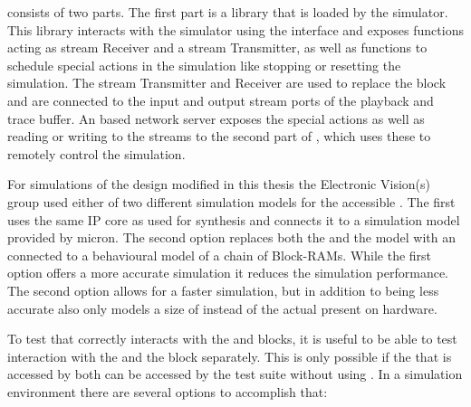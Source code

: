 \flange{} consists of two parts. The first part is a library that is loaded by the simulator. This library interacts with the simulator using the \DPI{} interface and exposes functions acting as stream Receiver and a stream Transmitter, as well as functions to schedule special actions in the simulation like stopping or resetting the simulation. The stream Transmitter and Receiver are used to replace the \HostARQ{} block and are connected to the input and output stream ports of the playback and trace buffer. An \RCF{}\autocite{ref:rcf} based network server exposes the special actions as well as reading or writing to the streams to the second part of \flange{}, which uses these to remotely control the simulation.

For simulations of the \FPGA{} design modified in this thesis the Electronic Vision(s) group used either of two different simulation models for the \AXI{} accessible \DRAM{}. The first uses the same \Xilinx \MIG{} IP core as used for synthesis and connects it to a \DDR{} simulation model provided by micron\autocite{ref:ddr3Model}. The second option replaces both the \MIG{} and the \DDR{} model with an \AXIBRAMController{} connected to a behavioural model of a chain of Block-RAMs. While the first option offers a more accurate simulation it reduces the simulation performance. The second option allows for a faster simulation, but in addition to being less accurate also only models a size of \SIMMEMSIZE{} instead of the actual \DDRSIZE{} present on hardware.

To test that \ayo{} correctly interacts with the \FAXI{} and \AXIDMA{} blocks, it is useful to be able to test interaction with the \FAXI{} and the \AXIDMA{} block separately. This is only possible if the \DRAM{} that is accessed by both can be accessed by the test suite without using \FAXI{}. In a simulation environment there are several options to accomplish that:

